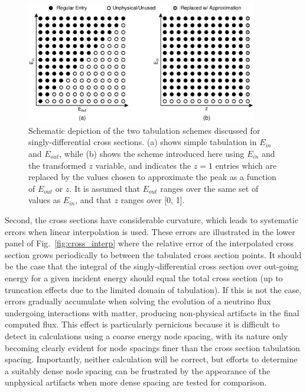 \documentclass[3p,12pt]{elsarticle}
\begin{document}
\begin{figure}
  \centering
  \includegraphics[width=0.9\textwidth]{fig/dsdy_tabulation.eps}
  \caption{Schematic depiction of the two tabulation schemes discussed for singly-differential cross sections. (a) shows simple tabulation in $E_{in}$ and $E_{out}$, while (b) shows the scheme introduced here using $E_{in}$ and the transformed $z$ variable, and indicates the $z = 1$ entries which are replaced by the values chosen to approximate the peak as a function of $E_{out}$ or $z$. It is assumed that $E_{out}$ ranges over the same set of values as $E_{in}$, and that $z$ ranges over [0, 1].}
  \label{fig:dsdy_tab}
\end{figure}

Second, the cross sections have considerable curvature, which leads to systematic errors when linear interpolation is used. 
These errors are illustrated in the lower panel of Fig.~\ref{fig:cross_interp} where the relative error of the interpolated cross section grows periodically to between the tabulated cross section points. 
It should be the case that the integral of the singly-differential cross section over out-going energy for a given incident energy should equal the total cross section (up to truncation effects due to the limited domain of tabulation). 
If this is not the case, errors gradually accumulate when solving the evolution of a neutrino flux undergoing interactions with matter, producing non-physical artifacts in the final computed flux. 
This effect is particularly pernicious because it is difficult to detect in calculations using a coarse energy node spacing, with its nature only becoming clearly evident for node spacings finer than the cross section tabulation spacing. 
Importantly, neither calculation will be correct, but efforts to determine a suitably dense node spacing can be frustrated by the appearance of the unphysical artifacts when more dense spacing are tested for comparison. 
\end{document}
